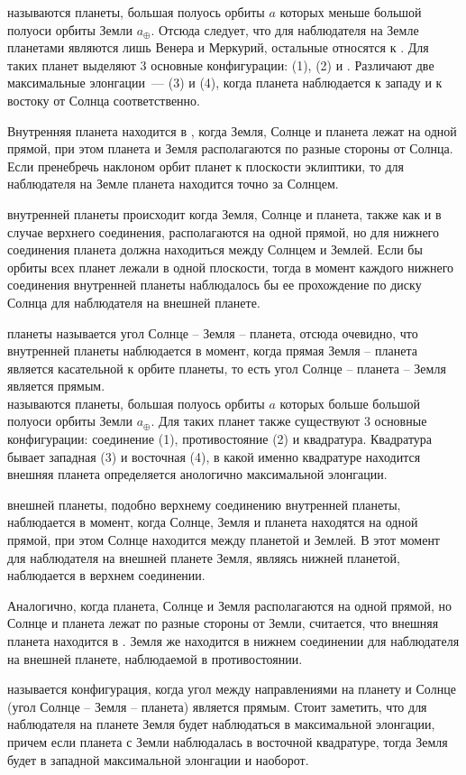  называются планеты, большая полуось орбиты 
$a$ которых меньше большой полуоси орбиты Земли $a_\oplus$. Отсюда следует, что 
для наблюдателя на Земле  планетами являются лишь Венера 
и Меркурий, остальные относятся к . Для таких планет выделяют 
3 основные конфигурации:  (1),  (2) и . Различают две максимальные 
элонгации~---  (3) и  (4), когда планета 
наблюдается к западу и к востоку от Солнца соответственно.

Внутренняя планета находится в , когда Земля, 
Солнце и планета лежат на одной прямой, при этом планета и Земля располагаются 
по разные стороны от Солнца. Если пренебречь наклоном орбит планет к плоскости 
эклиптики, то для наблюдателя на Земле планета находится точно за Солнцем.

 внутренней планеты происходит когда Земля, Солнце 
и планета, также как и в случае верхнего соединения, располагаются на одной 
прямой, но для нижнего соединения планета должна находиться между Солнцем и 
Землей. Если бы орбиты всех планет лежали в одной плоскости, тогда в момент 
каждого нижнего соединения внутренней планеты наблюдалось бы ее прохождение по 
диску Солнца для наблюдателя на внешней планете.

 планеты называется угол Солнце -- Земля -- планета, 
отсюда очевидно, что  внутренней планеты 
наблюдается в момент, когда прямая Земля -- планета является касательной к 
орбите планеты, то есть угол Солнце -- планета -- Земля является прямым.\\

 называются планеты, большая полуось орбиты $a$ 
которых больше большой полуоси орбиты Земли $a_\oplus$. Для таких планет также 
существуют 3 основные конфигурации: соединение (1), противостояние (2) и 
квадратура. Квадратура бывает западная (3) и восточная (4), в какой именно 
квадратуре находится внешняя планета определяется анологично максимальной 
элонгации.

 внешней планеты, подобно верхнему соединению внутренней 
планеты, наблюдается в момент, когда Солнце, Земля и планета находятся на одной 
прямой, при этом Солнце находится между планетой и Землей. В этот момент для 
наблюдателя на внешней планете Земля, являясь нижней планетой, наблюдается в 
верхнем соединении.

Аналогично, когда планета, Солнце и Земля располагаются на одной прямой, но 
Солнце и планета лежат по разные стороны от Земли, считается, что внешняя 
планета находится в . Земля же находится в нижнем 
соединении для наблюдателя на внешней планете, наблюдаемой в противостоянии.

 называется конфигурация, когда угол между направлениями 
на планету и Солнце (угол Солнце -- Земля -- планета) является прямым. Стоит 
заметить, что для наблюдателя на планете Земля будет наблюдаться в максимальной 
элонгации, причем если планета с Земли наблюдалась в восточной квадратуре, 
тогда Земля будет в западной максимальной элонгации и наоборот.
